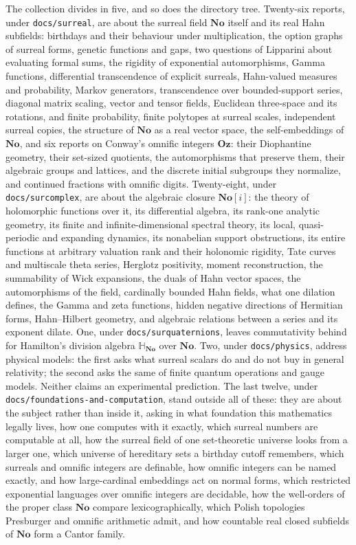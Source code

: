 \documentclass[11pt]{article}
\newcommand{\dir}[1]{\texttt{#1}}
\newcommand{\No}{\mathbf{No}}
\newcommand{\SC}{\mathbf{No}[i]}
\newcommand{\Oz}{\mathbf{Oz}}
\begin{document}
The collection divides in five, and so does the directory tree.  Twenty-six
reports, under \dir{docs/surreal}, are about the surreal field $\No$ itself and
its real Hahn subfields: birthdays and their behaviour under multiplication,
the option graphs of surreal forms, genetic functions and gaps, two questions
of Lipparini about evaluating formal sums, the rigidity of exponential
automorphisms, Gamma functions, differential transcendence of explicit
surreals, Hahn-valued measures and probability, Markov generators,
transcendence over bounded-support series, diagonal matrix scaling, vector
and tensor fields, Euclidean three-space and its rotations, and finite
probability, finite polytopes at surreal scales, independent surreal copies,
the structure of $\No$ as a real vector space, the self-embeddings of $\No$,
and six reports on Conway's omnific integers $\Oz$: their
Diophantine geometry, their set-sized quotients, the automorphisms that
preserve them, their algebraic groups and lattices, and the discrete initial
subgroups they normalize, and continued fractions with omnific digits.
Twenty-eight, under \dir{docs/surcomplex}, are about the algebraic closure $\SC$:
the theory of holomorphic functions over it, its differential algebra, its
rank-one analytic geometry, its finite and infinite-dimensional spectral
theory, its local, quasi-periodic and expanding dynamics, its nonabelian
support obstructions, its entire functions at arbitrary valuation rank and
their holonomic rigidity, Tate curves and multiscale theta series, Herglotz
positivity, moment reconstruction, the summability of Wick expansions,
the duals of Hahn vector spaces, the automorphisms of the field, cardinally
bounded Hahn fields, what one dilation defines, the Gamma and zeta functions,
hidden negative directions of Hermitian forms, Hahn--Hilbert geometry, and
algebraic relations between a series and its exponent dilate.  One, under
\dir{docs/surquaternions}, leaves
commutativity behind for Hamilton's division algebra $\mathbb{H}_{\No}$ over
$\No$.  Two, under \dir{docs/physics}, address physical models: the first asks what
surreal scalars do and do not buy in general relativity; the second asks the
same of finite quantum operations and gauge models. Neither claims an
experimental prediction.  The last twelve, under
\dir{docs/foundations-and-computation}, stand outside all of these: they are
about the subject rather than inside it, asking in what foundation this
mathematics legally lives, how one computes with it exactly, which surreal
numbers are computable at all, how the surreal field of one set-theoretic
universe looks from a larger one, which universe of hereditary sets a
birthday cutoff remembers, which surreals and omnific integers are
definable, how omnific integers can be named exactly, and how large-cardinal
embeddings act on normal forms, which restricted exponential languages
over omnific integers are decidable, how the well-orders of the proper
class $\No$ compare lexicographically, which Polish topologies
Presburger and omnific arithmetic admit, and how countable real closed
subfields of $\No$ form a Cantor family.
\end{document}
